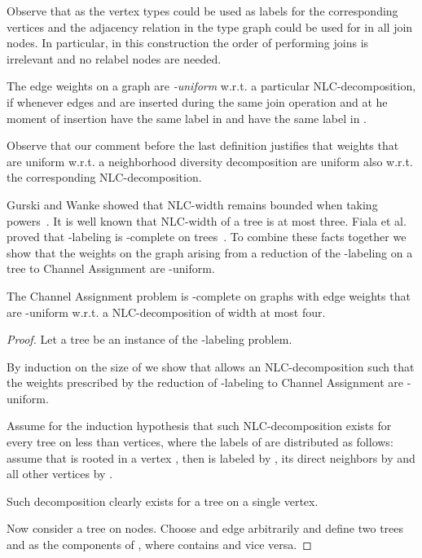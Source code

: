 \documentclass[a4paper,UKenglish]{lipics}
\newcommand{\NP}{{\sf{NP}}\xspace}
\theoremstyle{plain}
\theoremstyle{definition}
\begin{document}
{Observe that  as the vertex types could be used as labels for the corresponding vertices
and the adjacency relation in the type graph could be used for  in all join nodes. 
In particular, in this construction the order of performing joins is irrelevant and no relabel nodes are needed.

\begin{definition}
The edge weights  on a graph  are \emph{-uniform} w.r.t. a particular 
NLC-decomposition, if  
whenever edges  and  are inserted during the same join operation
and at he moment of insertion  have the same label in  and  have the same label in .
\end{definition}

Observe that our comment before the last definition justifies 
that weights that are uniform w.r.t. a neighborhood diversity decomposition 
are uniform also w.r.t. the corresponding NLC-decomposition.

Gurski and Wanke showed that NLC-width remains bounded when taking powers~\cite{t:GW09}.
It is well known that NLC-width of a tree is at most three. Fiala et al. proved
that {\sc -labeling} is \NP-complete on trees~\cite{l:FGK08}. To combine these facts together 
we show that the weights on the graph arising from a reduction of the -labeling 
on a tree to {\sc Channel Assignment} are -uniform.

\begin{theorem}
The {\sc Channel Assignment} problem is \NP-complete on graphs with edge 
weights that are -uniform w.r.t. a NLC-decomposition of width at most four.
\end{theorem}

\begin{proof}
Let a tree  be an instance of the {\sc -labeling} problem.

By induction on the size of  we show that  allows an NLC-decomposition  
such that the weights  prescribed by the reduction of {\sc -labeling}
to {\sc Channel Assignment} are -uniform.

Assume for the induction hypothesis that such NLC-decomposition 
exists for every tree  on less than  vertices, 
where the labels of  are distributed as follows:
assume that  is rooted in a vertex , then  is labeled by , its direct neighbors by  and all other vertices by .

Such decomposition clearly exists for a tree on a single vertex.

Now consider a tree  on  nodes. Choose and edge  arbitrarily and define two trees  and  as the components of , where  contains  and vice versa.


\end{proof}}
\end{document}
